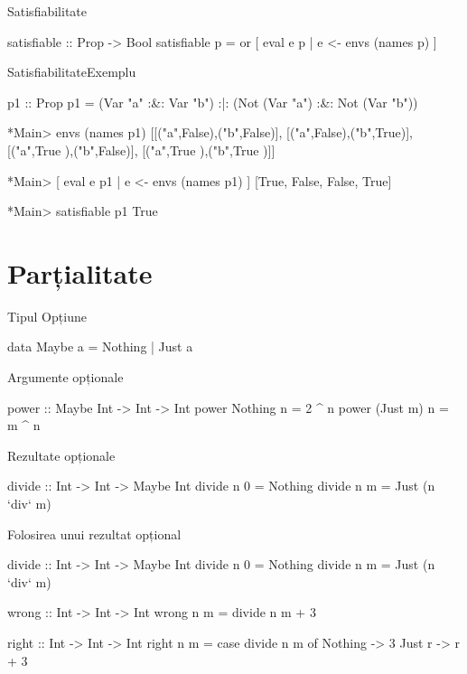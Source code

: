 \documentclass[xcolor=pdftex,romanian,colorlinks]{beamer}
\begin{document}
\begin{frame}[fragile]{Satisfiabilitate}
\begin{asciihs}
  satisfiable :: Prop -> Bool
  satisfiable p = or [ eval e p | e <- envs (names p) ]
\end{asciihs}
\end{frame}
\begin{frame}[fragile]{Satisfiabilitate}{Exemplu}
\vspace{-2ex}
\begin{asciihs}
  p1 :: Prop
  p1 = (Var "a" :&: Var "b") :|:
        (Not (Var "a") :&: Not (Var "b"))

  *Main> envs (names p1)
  [[("a",False),("b",False)],
   [("a",False),("b",True)],
   [("a",True ),("b",False)],
   [("a",True ),("b",True )]]

  *Main> [ eval e p1 | e <- envs (names p1) ]
  [True,
   False,
   False,
   True]

  *Main> satisfiable p1
  True
\end{asciihs}
\end{frame}
\section{Parțialitate}

\begin{frame}[fragile]{Tipul Opțiune}
\begin{asciihs}
   data Maybe a = Nothing | Just a
\end{asciihs}
\begin{block}
{Argumente opționale}
\begin{asciihs}
   power :: Maybe Int -> Int -> Int
   power Nothing n   = 2 ^ n
   power (Just m) n = m ^ n
\end{asciihs}
\end{block}

\begin{block}
{Rezultate opționale}
\begin{asciihs}
   divide :: Int -> Int -> Maybe Int
   divide n 0 = Nothing
   divide n m = Just (n `div` m)
\end{asciihs}
\end{block}
\end{frame}
\begin{frame}[fragile]{Folosirea unui rezultat opțional}
\begin{asciihs}
  divide :: Int -> Int -> Maybe Int
  divide n 0 = Nothing
  divide n m = Just (n `div` m)

  wrong :: Int -> Int -> Int
  wrong n m = divide n m + 3

  right :: Int -> Int -> Int
  right n m = case divide n m of
                  Nothing -> 3
                  Just r -> r + 3
\end{asciihs}
\end{frame}
\end{document}
